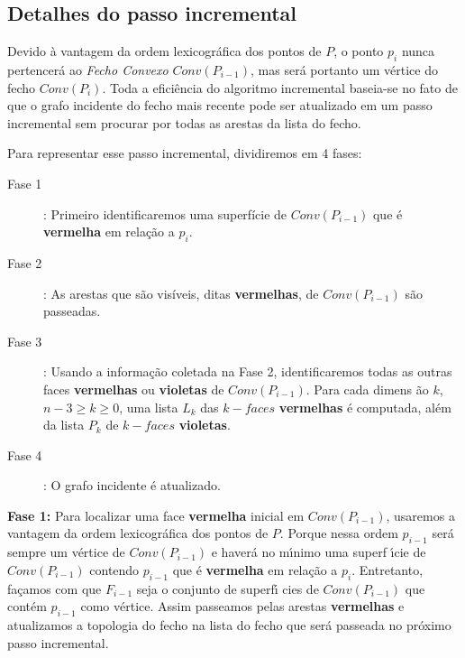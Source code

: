 \documentclass[12pt,a4paper]{book}
\begin{document}
\subsection{Detalhes do passo incremental}

Devido \`{a} vantagem da ordem lexicogr\'{a}fica dos pontos de $P$, o ponto $p_{i}$ nunca
pertencer\'{a} ao \textit{Fecho Convexo} $Conv(P_{i-1})$, mas ser\'{a} portanto um v\'{e}rtice
do fecho $Conv(P_{i})$. Toda a efici\^{e}ncia do algoritmo incremental baseia-se no fato de 
que o grafo incidente do fecho mais recente pode ser atualizado em um passo incremental sem
procurar por todas as arestas da lista do fecho.

Para representar esse passo incremental, dividiremos em 4 fases:

\begin{description}
\item[Fase 1]: Primeiro identificaremos uma superf\'{i}cie de $Conv(P_{i-1})$ que \'{e}
\textbf{\textbf{vermelha}} em rela\c{c}\~{a}o a $p_{i}$.
\end{description} 

\begin{description}
\item[Fase 2]: As arestas que s\~{a}o vis\'{i}veis, ditas \textbf{vermelhas},
de $Conv(P_{i-1})$ s\~{a}o passeadas.
\end{description} 

\begin{description}
\item[Fase 3]: Usando a informa\c{c}\~{a}o coletada na Fase 2, identificaremos
todas as outras faces \textbf{vermelhas} ou \textbf{\textbf{violetas}} de $Conv(P_{i-1})$. Para cada dimens%
\~{a}o $k$, $n-3\geq k\geq 0$, uma lista $L_{k}$ das $k-faces$ \textbf{vermelhas} \'{e} computada, al\'{e}m da lista $P_{k}$ de $k-faces$ \textbf{violetas}.
\end{description} 

\begin{description}
\item[Fase 4]: O grafo incidente \'{e} atualizado.
\end{description}

{\bf Fase 1:} Para localizar uma face \textbf{\textbf{vermelha}} inicial em $Conv(P_{i-1})$, usaremos a
vantagem da ordem lexicogr\'{a}fica dos pontos de $P$. Porque nessa ordem $p_{i-1}$ 
ser\'{a} sempre um v\'{e}rtice de $Conv(P_{i-1})$ e haver\'{a} no m\'{\i}nimo uma superf%
\'{\i}cie de $Conv(P_{i-1})$ contendo $p_{i-1}$ que \'{e} \textbf{vermelha} em rela\c{c}\~{a}o
a $p_{i}$. Entretanto, fa\c{c}amos com que $F_{i-1}$ seja o conjunto de superf\'{\i}%
cies de $Conv(P_{i-1})$ que cont\'{e}m $p_{i-1}$ como v\'{e}rtice. Assim passeamos pelas arestas 
\textbf{vermelhas} e atualizamos a topologia do fecho na lista do fecho que ser\'{a} passeada no 
pr\'{o}ximo passo incremental.
\end{document}
